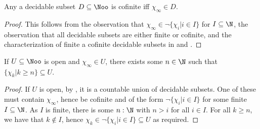 \begin{corollary}
 Any a decidable subset $D\subseteq\Noo$ is cofinite iff $\chi_\infty\in D$. 
\end{corollary}
\begin{proof}
  This follows from the observation that $\chi_\infty \in \neg \{\chi_i | i \in I\}$ for $I\subseteq \N$, 
  the observation that all decidable subsets are either finite or cofinite, 
  and the characterization of finite a cofinite decidable subsets in 
   and 
  .
\end{proof}
\begin{corollary}
  If $U\subseteq \Noo$ is open and $\chi_\infty \in U$, there exists some $n\in \N$ such that 
  $\{\chi_k | k\geq n\} \subseteq U$. 
\end{corollary}
\begin{proof}
  If $U$ is open, by , it is a countable union of decidable subsets. 
  One of these must contain $\chi_\infty$, hence be cofinite and 
  of the form $\neg \{ \chi_i | i \in I\}$ for some finite $I\subseteq \N$.
  As $I$ is finite, there is some $n:\N $ with $n>i$ for all $i\in I$. 
  For all $k\geq n$, we have that $k\notin I$, hence $\chi_k \in \neg \{\chi_i | i \in I\}\subseteq U$ as required. 
\end{proof}



%
%


